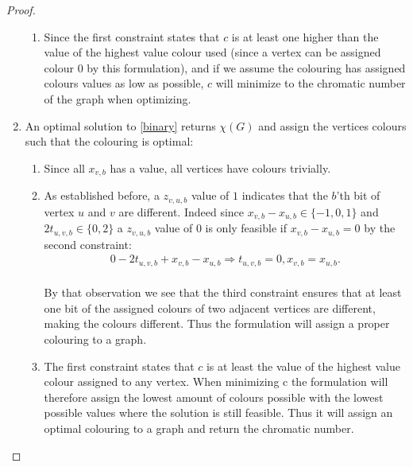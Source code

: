 \begin{proposition}
\begin{proof}
\begin{enumerate}
\begin{enumerate}
\item Since the first constraint states that $c$ is at least one higher than the value of the highest value colour used (since a vertex can be assigned colour $0$ by this formulation), and if we assume the colouring has assigned colours values as low as possible, $c$ will minimize to the chromatic number of the graph when optimizing.
\end{enumerate}
\item An optimal solution to \ref{binary} returns $\chi(G)$ and assign the vertices colours such that the colouring is optimal:\\
\begin{enumerate}
\item Since all $x_{v,b}$ has a value, all vertices have colours trivially.
\item As established before, a $z_{v,u,b}$ value of $1$ indicates that the $b$'th bit of vertex $u$ and $v$ are different. Indeed since $x_{v,b}-x_{u,b} \in \{-1,0,1\}$ and $2t_{u,v,b} \in \{0,2\}$ a $z_{v,u,b}$ value of 0 is only feasible if $x_{v,b}-x_{u,b} = 0$ by the second constraint:
\begin{align*}
0 - 2t_{u,v,b} + x_{v,b}-x_{u,b} \Rightarrow t_{u,v,b} = 0, x_{v,b}=x_{u,b}.
\end{align*}\\
By that observation we see that the third constraint ensures that at least one bit of the assigned colours of two adjacent vertices are different, making the colours different. Thus the formulation will assign a proper colouring to a graph.
\item  The first constraint states that $c$ is at least the value of the highest value colour assigned to any vertex. When minimizing c the formulation will therefore assign the lowest amount of colours possible with the lowest possible values where the solution is still feasible. Thus it will assign an optimal colouring to a graph and return the chromatic number. 
\end{enumerate}
\end{enumerate}
\end{proof}
\end{proposition}
